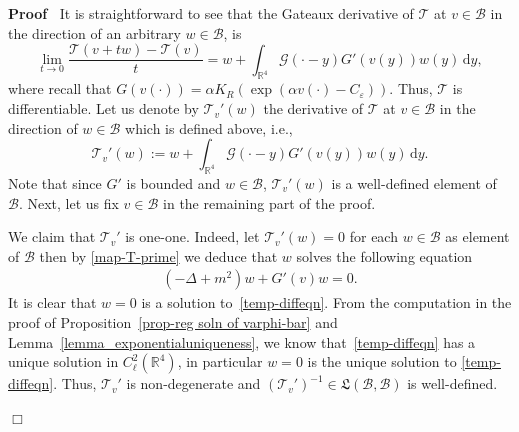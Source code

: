 \documentclass{article}
\newcommand{\assign}{:=}
\newcommand{\mathd}{\mathrm{d}}
\newenvironment{proof}{\noindent\textbf{Proof\ }}{\hspace*{\fill}$\Box$\medskip}
\begin{document}
\begin{proof}
  It is straightforward to see that the Gateaux derivative of $\mathcal{T}$ at
  $v \in \mathcal{B}$ in the direction of an arbitrary $w \in \mathcal{B}$, is
  \[ 
       \lim_{t \rightarrow 0} \frac{\mathcal{T} (v + t w) -\mathcal{T} (v)}{t}
       = w + \int_{\mathbb{R}^4} \mathcal{G} (\cdot - y) G' (v (y)) w (y)\, 
       \mathd y, \]
  where recall that $G (v (\cdot)) = \alpha K_R (\exp (\alpha v (\cdot) -
  C_{\varepsilon})) .$ Thus, $\mathcal{T}$ is differentiable. Let us denote by
  $\mathcal{T}_v' (w)$ the derivative of $\mathcal{T}$ at $v \in \mathcal{B}$
  in the direction of $w \in \mathcal{B}$ which is defined above, i.e., \
  \begin{equation}
      \mathcal{T}_v' (w) \assign w + \int_{\mathbb{R}^4} \mathcal{G} (\cdot -
      y) G' (v (y)) w (y) \, \mathd y.
    \label{map-T-prime}
  \end{equation}
  Note that since $G'$ is bounded and $w \in \mathcal{B}$, $\mathcal{T}_v'
  (w)$ is a well-defined element of $\mathcal{B}$. Next, let us fix $v \in
  \mathcal{B}$ in the remaining part of the proof. 
  
  We claim that
  $\mathcal{T}_v'$ is one-one. Indeed, let $\mathcal{T}_v' (w) = 0$ for each
  $w \in \mathcal{B}$ as element of $\mathcal{B}$ then by \eqref{map-T-prime}
  we deduce that $w$ solves the following equation
  \begin{equation}
    \begin{array}{l}
      (- \Delta + m^2) w + G' (v) w = 0.
    \end{array} \label{temp-diffeqn}
  \end{equation}
  It is clear that $w = 0$ is a solution to~\eqref{temp-diffeqn}. From the computation in the proof of Proposition~\ref{prop-reg soln of varphi-bar} and
  Lemma~\ref{lemma_exponentialuniqueness},  we know that~\eqref{temp-diffeqn}
  has a unique solution in $C_{\ell}^2 (\mathbb{R}^4)$, in
  particular $w = 0$ is the unique solution to \eqref{temp-diffeqn}. Thus,
  $\mathcal{T}_v'$ is non-degenerate and $(\mathcal{T}_v')^{- 1} \in
  \mathfrak{L} (\mathcal{B}, \mathcal{B})$ is well-defined. 
  

\end{proof}
\end{document}
